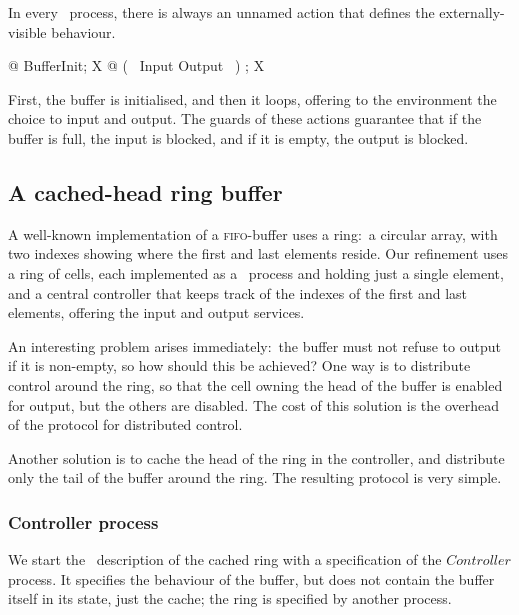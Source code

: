 \documentclass{article}
\begin{document}
In every \Circus\ process, there is always an unnamed action that
defines the externally-visible behaviour.
\begin{zed}
  @ BufferInit; \mu X @ (~ Input \extchoice Output ~) ; X
  \\ %
  \circend
\end{zed}
First, the buffer is initialised, and then it loops, offering to the
environment the choice to input and output.  The guards of these
actions guarantee that if the buffer is full, the input is blocked,
and if it is empty, the output is blocked.

\subsection{A cached-head ring buffer}

A well-known implementation of a \textsc{fifo}-buffer uses a ring:~a
circular array, with two indexes showing where the first and last
elements reside.  Our refinement uses a ring of cells, each
implemented as a \Circus\ process and holding just a single element,
and a central controller that keeps track of the indexes of the first
and last elements, offering the input and output services.

An interesting problem arises immediately:~the buffer must not refuse
to output if it is non-empty, so how should this be achieved?  One way
is to distribute control around the ring, so that the cell owning the
head of the buffer is enabled for output, but the others are disabled.
The cost of this solution is the overhead of the protocol for
distributed control.

Another solution is to cache the head of the ring in the controller,
and distribute only the tail of the buffer around the ring.  The
resulting protocol is very simple.

\subsubsection{Controller process}

We start the \Circus\ description of the cached ring with a
specification of the $Controller$ process.  It specifies the behaviour
of the buffer, but does not contain the buffer itself in its state,
just the cache; the ring is specified by another process.
\end{document}
